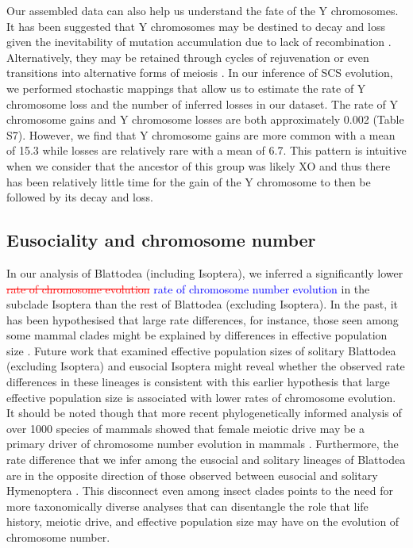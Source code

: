 \documentclass[]{rsos}%
\begin{document}
Our assembled data can also help us understand the fate of the Y chromosomes. 
It has been suggested that Y chromosomes may be destined to decay and loss given the inevitability of mutation accumulation due to lack of recombination \cite{steinemann2005}.
Alternatively, they may be retained through cycles of rejuvenation or even transitions into alternative forms of meiosis \cite{blackmon2015bioessay}.
In our inference of SCS evolution, we performed stochastic mappings that allow us to estimate the rate of Y chromosome loss and the number of inferred losses in our dataset.
The rate of Y chromosome gains and Y chromosome losses are both approximately 0.002 (Table S7). 
However, we find that Y chromosome gains are more common with a mean of 15.3 while losses are relatively rare with a mean of 6.7. 
This pattern is intuitive when we consider that the ancestor of this group was likely XO and thus there has been relatively little time for the gain of the Y chromosome to then be followed by its decay and loss.

\subsection{Eusociality and chromosome number}
In our analysis of Blattodea (including Isoptera), we inferred a significantly
lower \textcolor{red}{\st{rate of chromosome evolution}} \textcolor{blue}{rate of chromosome number evolution} in the subclade Isoptera than the rest of Blattodea (excluding Isoptera).
In the past, it has been hypothesised that large rate differences, for instance, those seen among some mammal clades might be explained by differences in effective population size \cite{bush1977rapid}.
Future work that examined effective population sizes of solitary Blattodea (excluding Isoptera) and eusocial Isoptera might reveal whether the observed rate differences in these lineages is consistent with this earlier hypothesis that large effective population size is associated with lower rates of chromosome evolution.
It should be noted though that more recent phylogenetically informed analysis of over 1000 species of mammals showed that female meiotic drive may be a primary driver of chromosome number evolution in mammals \cite{blackmon2019meiotic}.
Furthermore, the rate difference that we infer among the eusocial and solitary lineages of Blattodea are in the opposite direction of those observed between eusocial and solitary Hymenoptera \cite{ross2015}.
This disconnect even among insect clades points to the need for more taxonomically diverse analyses that can disentangle the role that life history, meiotic drive, and effective population size may have on the evolution of chromosome number.
\end{document}
